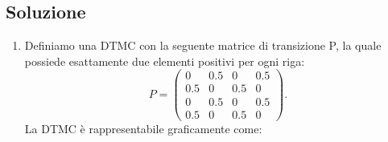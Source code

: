 \documentclass[
	12pt, %
]{fphw}
\begin{document}
\subsection*{Soluzione}
\begin{enumerate}
	\item Definiamo una DTMC con la seguente matrice di transizione P, la quale possiede esattamente due elementi positivi per ogni riga:
	\begin{equation*}
	P = \begin{pmatrix}
		0 & 0.5 & 0 & 0.5\\
		0.5 & 0 & 0.5 & 0\\
		0 & 0.5 & 0 & 0.5\\
		0.5 & 0 & 0.5 & 0
		\end{pmatrix}.
	\end{equation*}
	La DTMC è rappresentabile graficamente come:


\end{enumerate}
\end{document}
